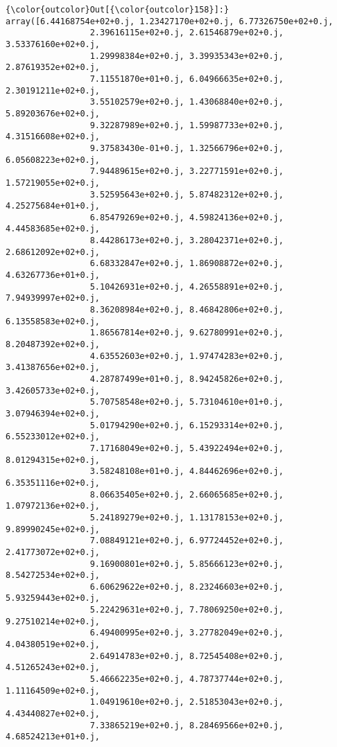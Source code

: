 \documentclass[11pt]{article}
\begin{document}
\begin{Verbatim}[commandchars=\\\{\}]
{\color{outcolor}Out[{\color{outcolor}158}]:} array([6.44168754e+02+0.j, 1.23427170e+02+0.j, 6.77326750e+02+0.j,
                 2.39616115e+02+0.j, 2.61546879e+02+0.j, 3.53376160e+02+0.j,
                 1.29998384e+02+0.j, 3.39935343e+02+0.j, 2.87619352e+02+0.j,
                 7.11551870e+01+0.j, 6.04966635e+02+0.j, 2.30191211e+02+0.j,
                 3.55102579e+02+0.j, 1.43068840e+02+0.j, 5.89203676e+02+0.j,
                 9.32287989e+02+0.j, 1.59987733e+02+0.j, 4.31516608e+02+0.j,
                 9.37583430e-01+0.j, 1.32566796e+02+0.j, 6.05608223e+02+0.j,
                 7.94489615e+02+0.j, 3.22771591e+02+0.j, 1.57219055e+02+0.j,
                 3.52595643e+02+0.j, 5.87482312e+02+0.j, 4.25275684e+01+0.j,
                 6.85479269e+02+0.j, 4.59824136e+02+0.j, 4.44583685e+02+0.j,
                 8.44286173e+02+0.j, 3.28042371e+02+0.j, 2.68612092e+02+0.j,
                 6.68332847e+02+0.j, 1.86908872e+02+0.j, 4.63267736e+01+0.j,
                 5.10426931e+02+0.j, 4.26558891e+02+0.j, 7.94939997e+02+0.j,
                 8.36208984e+02+0.j, 8.46842806e+02+0.j, 6.13558583e+02+0.j,
                 1.86567814e+02+0.j, 9.62780991e+02+0.j, 8.20487392e+02+0.j,
                 4.63552603e+02+0.j, 1.97474283e+02+0.j, 3.41387656e+02+0.j,
                 4.28787499e+01+0.j, 8.94245826e+02+0.j, 3.42605733e+02+0.j,
                 5.70758548e+02+0.j, 5.73104610e+01+0.j, 3.07946394e+02+0.j,
                 5.01794290e+02+0.j, 6.15293314e+02+0.j, 6.55233012e+02+0.j,
                 7.17168049e+02+0.j, 5.43922494e+02+0.j, 8.01294315e+02+0.j,
                 3.58248108e+01+0.j, 4.84462696e+02+0.j, 6.35351116e+02+0.j,
                 8.06635405e+02+0.j, 2.66065685e+02+0.j, 1.07972136e+02+0.j,
                 5.24189279e+02+0.j, 1.13178153e+02+0.j, 9.89990245e+02+0.j,
                 7.08849121e+02+0.j, 6.97724452e+02+0.j, 2.41773072e+02+0.j,
                 9.16900801e+02+0.j, 5.85666123e+02+0.j, 8.54272534e+02+0.j,
                 6.60629622e+02+0.j, 8.23246603e+02+0.j, 5.93259443e+02+0.j,
                 5.22429631e+02+0.j, 7.78069250e+02+0.j, 9.27510214e+02+0.j,
                 6.49400995e+02+0.j, 3.27782049e+02+0.j, 4.04380519e+02+0.j,
                 2.64914783e+02+0.j, 8.72545408e+02+0.j, 4.51265243e+02+0.j,
                 5.46662235e+02+0.j, 4.78737744e+02+0.j, 1.11164509e+02+0.j,
                 1.04919610e+02+0.j, 2.51853043e+02+0.j, 4.43440827e+02+0.j,
                 7.33865219e+02+0.j, 8.28469566e+02+0.j, 4.68524213e+01+0.j,

\end{Verbatim}
\end{document}
